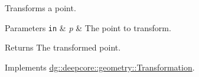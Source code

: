 Transforms a point. 


\begin{DoxyParams}[1]{Parameters}
\mbox{\tt in}  & {\em p} & The point to transform. \\
\hline
\end{DoxyParams}
\begin{DoxyReturn}{Returns}
The transformed point. 
\end{DoxyReturn}


Implements \hyperlink{structdg_1_1deepcore_1_1geometry_1_1_transformation_a1a7c7cf330f61adeba1803dd3651d479}{dg\+::deepcore\+::geometry\+::\+Transformation}.

